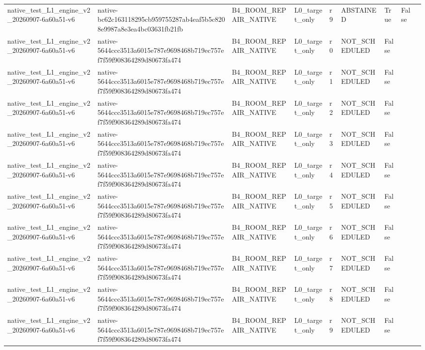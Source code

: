 \begin{tabular}{lllllllll}
native\_test\_L1\_engine\_v2\_20260907-6a60a51-v6 & native-bc62c163118295cb959755287ab4eaf5b5c8208e9987a8e3ea4bc03631fb21fb & B4\_ROOM\_REPAIR\_NATIVE & L0\_target\_only & r9 & ABSTAINED & True & False &  \\
native\_test\_L1\_engine\_v2\_20260907-6a60a51-v6 & native-5644ccc3513a6015e787e9698468b719ec757ef7f59f908364289d80673fa474 & B4\_ROOM\_REPAIR\_NATIVE & L0\_target\_only & r0 & NOT\_SCHEDULED & False &  &  \\
native\_test\_L1\_engine\_v2\_20260907-6a60a51-v6 & native-5644ccc3513a6015e787e9698468b719ec757ef7f59f908364289d80673fa474 & B4\_ROOM\_REPAIR\_NATIVE & L0\_target\_only & r1 & NOT\_SCHEDULED & False &  &  \\
native\_test\_L1\_engine\_v2\_20260907-6a60a51-v6 & native-5644ccc3513a6015e787e9698468b719ec757ef7f59f908364289d80673fa474 & B4\_ROOM\_REPAIR\_NATIVE & L0\_target\_only & r2 & NOT\_SCHEDULED & False &  &  \\
native\_test\_L1\_engine\_v2\_20260907-6a60a51-v6 & native-5644ccc3513a6015e787e9698468b719ec757ef7f59f908364289d80673fa474 & B4\_ROOM\_REPAIR\_NATIVE & L0\_target\_only & r3 & NOT\_SCHEDULED & False &  &  \\
native\_test\_L1\_engine\_v2\_20260907-6a60a51-v6 & native-5644ccc3513a6015e787e9698468b719ec757ef7f59f908364289d80673fa474 & B4\_ROOM\_REPAIR\_NATIVE & L0\_target\_only & r4 & NOT\_SCHEDULED & False &  &  \\
native\_test\_L1\_engine\_v2\_20260907-6a60a51-v6 & native-5644ccc3513a6015e787e9698468b719ec757ef7f59f908364289d80673fa474 & B4\_ROOM\_REPAIR\_NATIVE & L0\_target\_only & r5 & NOT\_SCHEDULED & False &  &  \\
native\_test\_L1\_engine\_v2\_20260907-6a60a51-v6 & native-5644ccc3513a6015e787e9698468b719ec757ef7f59f908364289d80673fa474 & B4\_ROOM\_REPAIR\_NATIVE & L0\_target\_only & r6 & NOT\_SCHEDULED & False &  &  \\
native\_test\_L1\_engine\_v2\_20260907-6a60a51-v6 & native-5644ccc3513a6015e787e9698468b719ec757ef7f59f908364289d80673fa474 & B4\_ROOM\_REPAIR\_NATIVE & L0\_target\_only & r7 & NOT\_SCHEDULED & False &  &  \\
native\_test\_L1\_engine\_v2\_20260907-6a60a51-v6 & native-5644ccc3513a6015e787e9698468b719ec757ef7f59f908364289d80673fa474 & B4\_ROOM\_REPAIR\_NATIVE & L0\_target\_only & r8 & NOT\_SCHEDULED & False &  &  \\
native\_test\_L1\_engine\_v2\_20260907-6a60a51-v6 & native-5644ccc3513a6015e787e9698468b719ec757ef7f59f908364289d80673fa474 & B4\_ROOM\_REPAIR\_NATIVE & L0\_target\_only & r9 & NOT\_SCHEDULED & False &  &  \\

\end{tabular}
